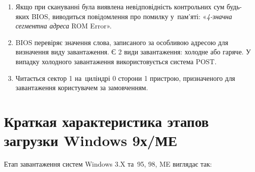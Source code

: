 \documentclass[
	a4paper,
	oneside,
	DIV = 14,
	fontsize = 14pt,
	headings = normal,
]{scrartcl}
\begin{document}
\begin{enumerate}
			\item Якщо при скануванні була виявлена невідповідність контрольних сум будь-яких \textenglish{BIOS}, виводиться повідомлення про помилку у~пам'яті: «\emph{4-значна сегментна адреса} \textenglish{ROM Error}».
			\item \textenglish{BIOS} перевіряє значення слова, записаного за особливою адресою для визначення виду завантаження. Є 2 види завантаження: холодне або гаряче. У випадку холодного завантаження використовується система \textenglish{POST}.
			\item Читається сектор 1 на~циліндрі 0 сторони 1 пристрою, призначеного для завантаження користувачем за замовченням.
		\end{enumerate}

	\section{Краткая характеристика этапов загрузки \textenglish{Windows 9х/МЕ}}
		Етап завантаження систем \textenglish{Windows 3.X} та~\textenglish{95, 98, ME} виглядає так:
\end{document}
